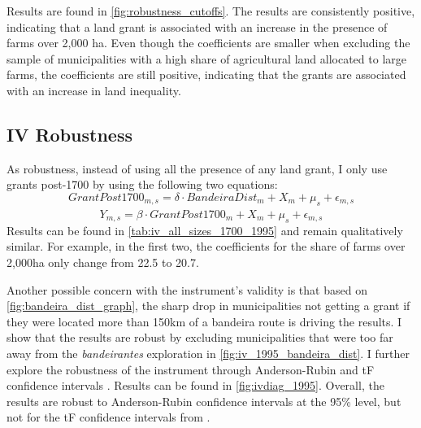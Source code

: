\documentclass[11pt]{article}
\begin{document}
Results are found in \autoref{fig:robustness_cutoffs}. 
The results are consistently positive, indicating that a land grant is associated with an increase in the presence of farms over 2,000 ha. 
Even though the coefficients are smaller when excluding the sample of municipalities with a high share of agricultural land allocated to large farms, the coefficients are still positive, indicating that the grants are associated with an increase in land inequality.

\subsection{IV Robustness}

As robustness, instead of using all the presence of any land grant, I only use grants post-1700 by using the following two equations:
\begin{equation}
  \label{eqn:firststage_1700}
  GrantPost1700_{m,s} = \delta \cdot BandeiraDist_{m} +  X_{m} + \mu_s  + \epsilon_{m,s}
\end{equation}
\begin{equation}
  \label{eqn:ivequation_1700}
  Y_{m,s} = \beta \cdot \widehat{GrantPost1700}_{m} + X_{m} + \mu_s +  \epsilon_{m,s}
\end{equation}
Results can be found in \autoref{tab:iv_all_sizes_1700_1995} and remain qualitatively similar.
For example, in the first two, the coefficients for the share of farms over 2,000ha only change from 22.5 to 20.7. 

Another possible concern with the instrument's validity is that based on \autoref{fig:bandeira_dist_graph}, the sharp drop in municipalities not getting a grant if they were located more than 150km of a bandeira route is driving the results.
I show that the results are robust by excluding municipalities that were too far away from the \textit{bandeirantes} exploration in \autoref{fig:iv_1995_bandeira_dist}.
I further explore the robustness of the instrument through Anderson-Rubin and tF confidence intervals \parencite{Anderson1949-aa, Lee2022-jw}. Results can be found in \autoref{fig:ivdiag_1995}. Overall, the results are robust to Anderson-Rubin confidence intervals at the 95\% level, but not for the tF confidence intervals from \textcite{Lee2022-jw}.

\end{document}
